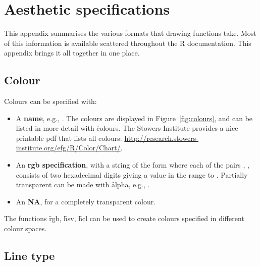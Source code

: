 

\chapter{Aesthetic specifications}
\label{cha:specifications}

This appendix summarises the various formats that  drawing functions take.  Most of this information is available scattered throughout the R documentation.  This appendix brings it all together in one place. 

\section{Colour}
\label{sec:colour_spec}

Colours can be specified with: 

\begin{itemize}
  \item A {\bf name}, e.g., . The colours are displayed in Figure~\ref{fig:colours}, and can be listed in more detail with \f{colours}. The Stowers Institute provides a nice printable pdf that lists all colours:  \url{http://research.stowers-institute.org/efg/R/Color/Chart/}.
    
  \item An {\bf rgb specification}, with a string of the form  where each of the pairs , ,  consists of two hexadecimal digits giving a value in the range  to .  Partially transparent can be made with \f{alpha}, e.g., .

  \item An {\bf NA}, for a completely transparent colour.  
\end{itemize}

The functions \f{rgb}, \f{hsv}, \f{hcl} can be used to create colours specified in different colour spaces.


\section{Line type}
\label{sec:line_type_spec}

